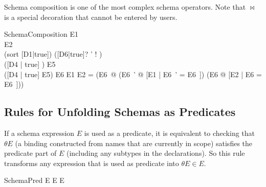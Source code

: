 \documentclass{entcs}
\newcommand{\sexprUnfoldsTo}{\mathrel{=_{se}}}
\newcommand{\schemaEquals}{\mathrel{=_S}}
\begin{document}
Schema composition is one of the most complex schema operators.
Note that $\bowtie$ is a special decoration that cannot be entered by
users.

\begin{zedrule}{SchemaComposition}
  E1 \hasType \power [D1 | true] \\
  E2 \hasType \power [D2 | true] \\
  (sort [D1|true]) \is ([D6|true]? \land [D4|true]' \land
                        [D8|true]! \land [D9|true]) \\
  ([D4 | true] \schemaminus [D2 | true]) \is E5\\
  ([D4 | true] \schemaminus E5) \is E6 %
\derives
  E1 \semi E2 =
  (\exists E6~\bowtie @ (\exists E6~' @ [E1 | \theta E6~' = \theta E6~\bowtie])
                   \land
                   (\exists E6   @ [E2 | \theta E6   = \theta E6~\bowtie]))
\end{zedrule}



%


\subsection{Rules for Unfolding Schemas as Predicates}

If a schema expression $E$ is used as a predicate, it is equivalent to
checking that $\theta E$ (a binding constructed from names that are
currently in scope) satisfies the predicate part of $E$ 
(including any subtypes in the declarations).  So this rule
transforms any expression that is used as predicate into $\theta E \in E$.
\begin{zedrule}{SchemaPred}
  E \iff \theta E \in E
\end{zedrule}
\end{document}
